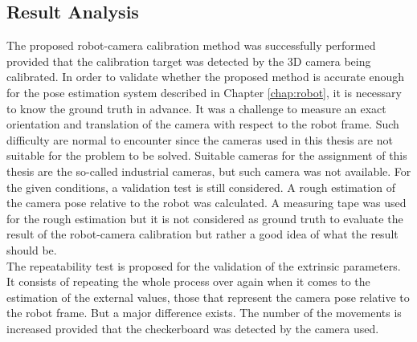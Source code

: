 \subsection{Result Analysis}

The proposed robot-camera calibration method was successfully performed provided that the calibration target was detected by the 3D camera being calibrated. In order to validate whether the proposed method is accurate enough for the pose estimation system described in Chapter \ref{chap:robot}, it is necessary to know the ground truth in advance. It was a challenge to measure an exact orientation and translation of the camera with respect to the robot frame. Such difficulty are normal to encounter since the cameras used in this thesis are not suitable for the problem to be solved. Suitable cameras for the assignment of this thesis are the so-called industrial cameras, but such camera was not available.  
For the given conditions, a validation test is still considered. A rough estimation of the camera pose relative to the robot was calculated. A measuring tape was used for the rough estimation but it is not considered as ground truth to evaluate the result of the robot-camera calibration but rather a good idea of what the result should be. \\
The repeatability test is proposed for the validation of the extrinsic parameters. It consists of repeating the whole process over again when it comes to the estimation of the external values, those that represent the camera pose relative to the robot frame. But a major difference exists. The number of the movements is increased provided that the checkerboard was detected by the camera used.

